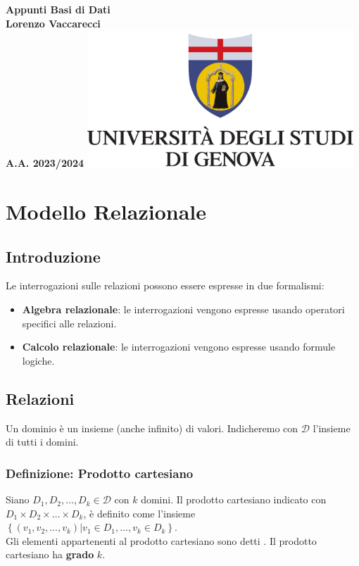 \documentclass[12pt, a4paper]{report}
\begin{document}
    \begin{titlepage}
        \centering
        \vfill
        {\bfseries\Huge
            Appunti Basi di Dati\\
            \vskip1cm
            \Large
            Lorenzo Vaccarecci\\
            \vskip1cm
            \normalsize
            A.A. 2023/2024
        }
        \vfill
        \includegraphics[width=10cm]{Appunti Latex/Immagini/logoUnige.png}
        \vfill
        \vfill
    \end{titlepage}
    \tableofcontents
    \chapter{Modello Relazionale}
        \section{Introduzione}
            Le interrogazioni sulle relazioni possono essere espresse in due formalismi:
            \begin{itemize}
                \item \textbf{Algebra relazionale}: le interrogazioni vengono espresse usando operatori specifici alle relazioni.
                \item \textbf{Calcolo relazionale}: le interrogazioni vengono espresse usando formule logiche.
            \end{itemize}
        \section{Relazioni}
            Un dominio è un insieme (anche infinito) di valori. Indicheremo con $\mathcal{D}$ l'insieme di tutti i domini.
            \subsection{Definizione: Prodotto cartesiano}
                Siano $D_{1},D_{2},\ldots,D_{k} \in \mathcal{D} \text{ con } k$ domini. Il prodotto cartesiano indicato con $D_{1}\times D_{2}\times \ldots \times D_{k}$, è definito come l'insieme $\left\{\left(v_{1},v_{2},\ldots,v_{k}\right)|v_{1}\in D_{1},\ldots,v_{k}\in D_{k}\right\}$.\\
                Gli elementi appartenenti al prodotto cartesiano sono detti . Il prodotto cartesiano ha \textbf{grado} $k$.
\end{document}
